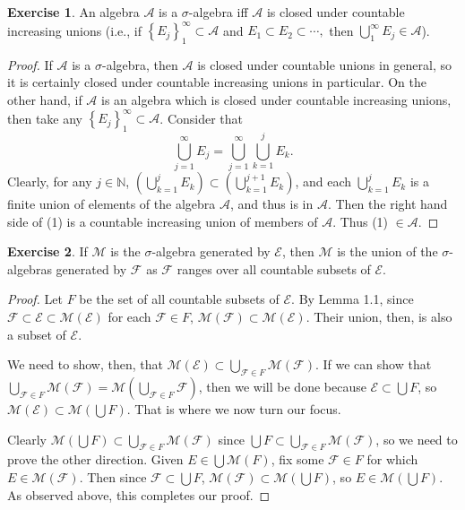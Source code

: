 \documentclass{article}
\theoremstyle{definition}
\newtheorem{ex}{Exercise}
\begin{document}
\begin{ex}
	An algebra $\mathscr{A}$ is a $\sigma$-algebra iff $\mathscr{A}$ is closed under countable increasing unions (i.e., if $\left\lbrace E_j \right\rbrace _{1}^{\infty} \subset \mathscr{A}$ and $E_1 \subset E_2 \subset \cdots,$ then $\bigcup _{1}^{\infty}E_j \in \mathscr{A}$).
\end{ex}
\begin{proof}
	If $\mathscr{A}$ is a $\sigma$-algebra, then $\mathscr{A}$ is closed under countable unions in general, so it is certainly closed under countable increasing unions in particular.
	On the other hand, if $\mathscr{A}$ is an algebra which is closed under countable increasing unions, then take any $\left\lbrace E_j \right\rbrace _{1}^{\infty} \subset \mathscr{A}$.
	Consider that \begin{equation*}
		\bigcup _{j = 1}^{\infty} E_j = \bigcup _{j = 1}^{\infty} \bigcup _{k = 1}^{j} E_k. \tag{1}
	\end{equation*}
	Clearly, for any $j \in \mathbb{N}$, $\left( \bigcup _{k = 1}^{j} E_k  \right)\subset \left( \bigcup _{k = 1}^{j + 1} E_k \right)$, and each $\bigcup_{k = 1}^{j}E_k$ is a finite union of elements of the algebra $\mathscr{A}$, and thus is in $\mathscr{A}$.
	Then the right hand side of (1) is a countable increasing union of members of $\mathscr{A}$.
	Thus (1) $\in \mathscr{A}$.
\end{proof}

\begin{ex}
	If $\mathscr{M}$ is the $\sigma$-algebra generated by $\mathscr{E}$, then $\mathscr{M}$ is the union of the $\sigma$-algebras generated by $\mathscr{F}$ as $\mathscr{F}$ ranges over all countable subsets of $\mathscr{E}$.
\end{ex}
\begin{proof}
	Let $F$ be the set of all countable subsets of $\mathscr{E}$.
	By Lemma 1.1, since $\mathscr{F} \subset \mathscr{E} \subset \mathscr{M}(\mathscr{E})$ for each $\mathscr{F} \in F$, $\mathscr{M}(\mathscr{F}) \subset \mathscr{M}(\mathscr{E})$.
	Their union, then, is also a subset of $\mathscr{E}$.

	We need to show, then, that $\mathscr{M}(\mathscr{E}) \subset \bigcup_{\mathscr{F} \in F}\mathscr{M}(\mathscr{F})$.
	If we can show that $\bigcup_{\mathscr{F} \in F} \mathscr{M}(\mathscr{F}) = \mathscr{M}(\bigcup_{\mathscr{F} \in F} \mathscr{F})$, then we will be done because $\mathscr{E} \subset \bigcup F$, so $\mathscr{M}(\mathscr{E}) \subset \mathscr{M}(\bigcup F)$.
	That is where we now turn our focus.

	Clearly $\mathscr{M}(\bigcup F) \subset \bigcup_{\mathscr{F} \in F} \mathscr{M}(\mathscr{F})$ since $\bigcup F \subset \bigcup_{\mathscr{F} \in F} \mathscr{M}(\mathscr{F})$, so we need to prove the other direction.
	Given $E \in \bigcup \mathscr{M}(F)$, fix some $\mathscr{F} \in F$ for which $E \in \mathscr{M}(\mathscr{F})$.
	Then since $\mathscr{F} \subset \bigcup F$, $\mathscr{M}(\mathscr{F}) \subset \mathscr{M}(\bigcup F)$, so $E \in \mathscr{M}(\bigcup F)$.
	As observed above, this completes our proof.
\end{proof}
\end{document}

